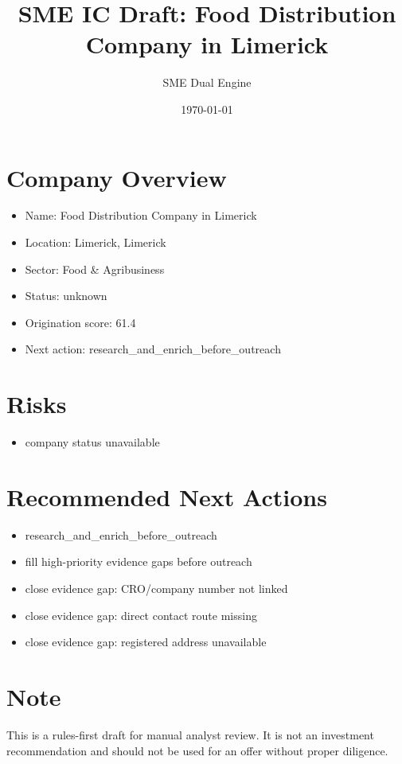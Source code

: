 \documentclass[11pt,a4paper]{article}
\title{SME IC Draft: Food Distribution Company in Limerick}
\author{SME Dual Engine}
\date{\today}
\begin{document}
\maketitle
\section*{Company Overview}
\begin{itemize}[leftmargin=1.4em]
\item Name: Food Distribution Company in Limerick
\item Location: Limerick, Limerick
\item Sector: Food \& Agribusiness
\item Status: unknown
\item Origination score: 61.4
\item Next action: research\_and\_enrich\_before\_outreach
\end{itemize}
\section*{Risks}
\begin{itemize}[leftmargin=1.4em]
\item company status unavailable
\end{itemize}
\section*{Recommended Next Actions}
\begin{itemize}[leftmargin=1.4em]
\item research\_and\_enrich\_before\_outreach
\item fill high-priority evidence gaps before outreach
\item close evidence gap: CRO/company number not linked
\item close evidence gap: direct contact route missing
\item close evidence gap: registered address unavailable
\end{itemize}
\section*{Note}
This is a rules-first draft for manual analyst review. It is not an investment
recommendation and should not be used for an offer without proper diligence.
\end{document}
